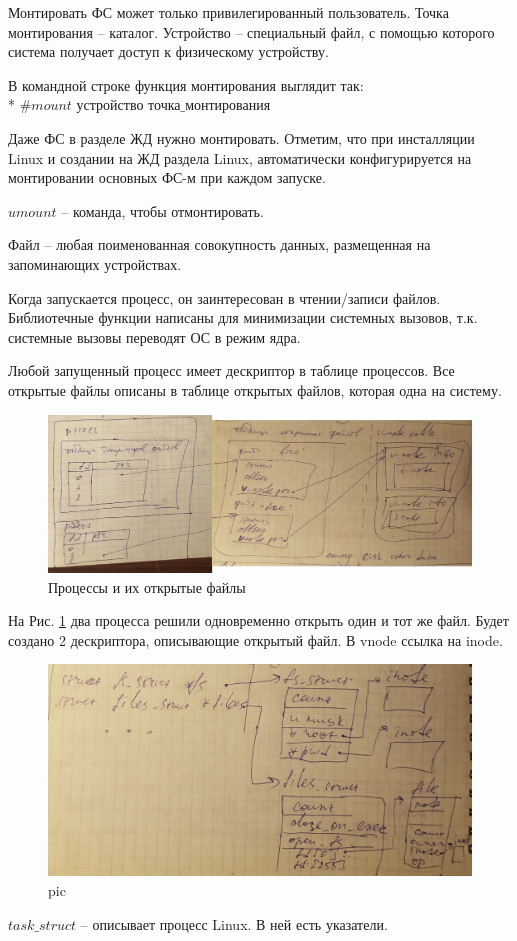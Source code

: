 Монтировать ФС может только привилегированный пользователь.  Точка монтирования – каталог. Устройство – специальный файл, с помощью которого система получает доступ к физическому устройству. 

В командной строке функция монтирования выглядит так:\\* 
$\# mount \text{ устройство точка\_монтирования}$

Даже ФС в разделе ЖД нужно монтировать. Отметим, что при инсталляции Linux и создании на ЖД раздела Linux, автоматически конфигурируется на монтировании основных ФС-м при каждом запуске.

$umount$ – команда, чтобы отмонтировать.

Файл – любая поименованная совокупность данных, размещенная на запоминающих устройствах.

Когда запускается процесс, он заинтересован в чтении/записи файлов. Библиотечные функции написаны для минимизации системных вызовов, т.к. системные вызовы переводят ОС в режим ядра.

Любой запущенный процесс имеет дескриптор в таблице процессов. Все открытые файлы описаны в таблице открытых файлов, которая одна на систему.

\begin{figure}[H]
  \centering
  \includegraphics[width=\textwidth]{pic/3.png}
  \caption{Процессы и их открытые файлы}
  \label{pic:proc_open_file}
\end{figure}

На Рис. \ref{pic:proc_open_file} два процесса решили одновременно открыть один и тот же файл. Будет создано 2 дескриптора, описывающие открытый файл. В vnode ссылка на inode.

\begin{figure}[H]
  \centering
  \includegraphics[width=\textwidth]{pic/4.png}
  \caption{pic}
  \label{pic:task_struct}
\end{figure}

$task\_struct$ – описывает процесс Linux. В ней есть указатели.

 


